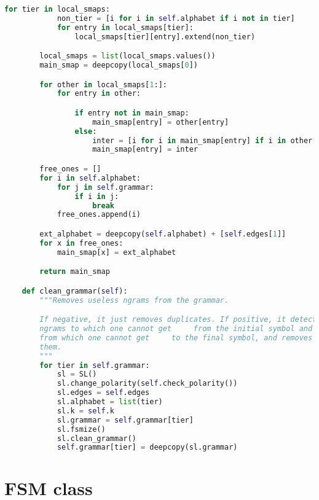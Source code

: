 \begin{lstlisting}[language=Python]
        for tier in local_smaps:
            non_tier = [i for i in self.alphabet if i not in tier]
            for entry in local_smaps[tier]:
                local_smaps[tier][entry].extend(non_tier)

        local_smaps = list(local_smaps.values())
        main_smap = deepcopy(local_smaps[0])

        for other in local_smaps[1:]:
            for entry in other:

                if entry not in main_smap:
                    main_smap[entry] = other[entry]
                else:
                    inter = [i for i in main_smap[entry] if i in other[entry]]
                    main_smap[entry] = inter

        free_ones = []
        for i in self.alphabet:
            for j in self.grammar:
                if i in j:
                    break
            free_ones.append(i)

        ext_alphabet = deepcopy(self.alphabet) + [self.edges[1]]
        for x in free_ones:
            main_smap[x] = ext_alphabet

        return main_smap

    def clean_grammar(self):
        """Removes useless ngrams from the grammar.

        If negative, it just removes duplicates. If positive, it detects
        ngrams to which one cannot get     from the initial symbol and
        from which one cannot get     to the final symbol, and removes
        them.
        """
        for tier in self.grammar:
            sl = SL()
            sl.change_polarity(self.check_polarity())
            sl.edges = self.edges
            sl.alphabet = list(tier)
            sl.k = self.k
            sl.grammar = self.grammar[tier]
            sl.fsmize()
            sl.clean_grammar()
            self.grammar[tier] = deepcopy(sl.grammar)
\end{lstlisting}

\section{FSM class}

